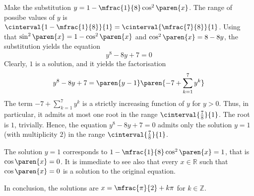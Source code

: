 Make the substitution $y = 1 - \mfrac{1}{8} \cos^2\paren{x}$.
The range of possibe values of $y$ is $\cinterval{1 - \mfrac{1}{8}}{1} = \cinterval{\mfrac{7}{8}}{1}$.
Using that $\sin^2\paren{x} = 1 - \cos^2\paren{x}$ and $\cos^2\paren{x} = 8 - 8 y$,
the substitution yields the equation
\begin{equation*}
y^8 - 8 y + 7 = 0
\end{equation*}
Clearly, $1$ is a solution, and it yields the factorisation
\begin{equation*}
  y^8 - 8 y + 7 = \paren{y - 1}\paren{ - 7 + \sum\limits_{k = 1}^{7} {y^k}}
\end{equation*}
The term $- 7 + \sum\limits_{k = 1}^{7} {y^k}$
is a strictly increasing function of $y$ for $y > 0$.
Thus, in particular, it admits at most one root in the range $\cinterval{\frac{7}{8}}{1}$.
The root is $1$, trivially.
Hence, the equation $y^8 - 8 y + 7 = 0$ admits only the solution $y = 1$ (with multiplicity $2$)
in the range $\cinterval{\frac{7}{8}}{1}$.

The solution $y = 1$ corresponds to $1 - \mfrac{1}{8} \cos^2\paren{x} = 1$,
that is $\cos\paren{x} = 0$.
It is immediate to see also that every $x \in \mathbb{R}$ such that $\cos\paren{x} = 0$
is a solution to the original equation.

In conclusion, the solutions are $x = \mfrac{\pi}{2} + k \pi$ for $k \in \mathbb{Z}$.
